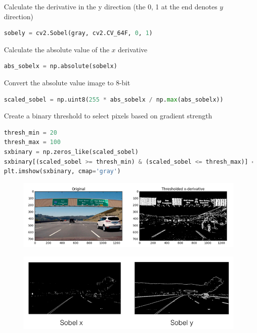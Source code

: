 \documentclass[12pt]{article}
\begin{document}
Calculate the derivative in the y direction (the 0, 1 at the end denotes $y$ direction)

\begin{lstlisting}[language=Python]
sobely = cv2.Sobel(gray, cv2.CV_64F, 0, 1)
\end{lstlisting}

Calculate the absolute value of the $x$ derivative

\begin{lstlisting}[language=Python]
abs_sobelx = np.absolute(sobelx)
\end{lstlisting}

Convert the absolute value image to 8-bit

\begin{lstlisting}[language=Python]
scaled_sobel = np.uint8(255 * abs_sobelx / np.max(abs_sobelx))
\end{lstlisting}

Create a binary threshold to select pixels based on gradient strength

\begin{lstlisting}[language=Python]
thresh_min = 20
thresh_max = 100
sxbinary = np.zeros_like(scaled_sobel)
sxbinary[(scaled_sobel >= thresh_min) & (scaled_sobel <= thresh_max)] = 1
plt.imshow(sxbinary, cmap='gray')
\end{lstlisting}

\begin{figure}[htp]
    \centering
    \includegraphics[width=15cm]{sobel_x.png}
    \label{fig:sobel_x}
\end{figure}

\begin{figure}[htp]
    \centering
    \includegraphics[width=15cm]{sobel_x_y.png}
    \label{fig:sobel_x_y}
\end{figure}
\end{document}
